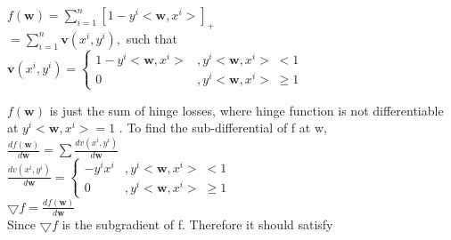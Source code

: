\documentclass[a4paper,11pt]{article}
\begin{document}
\begin{mlsolution}

\begin{math}f \left ( \textbf{w} \right ) = \sum_{i=1}^{n} \left [  1 - y^{i}<\textbf{w}, x^{i}> \right ]_{+}\end{math}\\

\begin{math}
= \sum_{i=1}^{n} \textbf{v}\left ( x^{i}, y^{i} \right ),\end{math} such that \begin{math}\textbf{v}\left ( x^{i}, y^{i} \right ) = \left\{\begin{matrix}
1 - y^{i}<\textbf{w}, x^{i}> &, y^{i}<\textbf{w}, x^{i}> \;<  1\\
0 & , y^{i}<\textbf{w}, x^{i}> \;\geq  1
\end{matrix}\right.
\end{math}

\begin{math}
f\left ( \textbf{w} \right )
\end{math} is just the sum of hinge losses, where hinge function is not differentiable at \begin{math}y^{i}<\textbf{w}, x^{i}> = 1\end{math} . To find the sub-differential of f at w, \\

\begin{math}
\frac{df\left ( \textbf{w} \right )}{d\textbf{w}} = \sum \frac{dv\left ( x^{i}, y^{i} \right )}{d\textbf{w}}
\end{math}\\

\begin{math}
\frac{dv\left ( x^{i}, y^{i} \right )}{d\textbf{w}} = \left\{\begin{matrix}
-y^{i}x^{i} &,  y^{i}<\textbf{w}, x^{i}> \;<  1\\ 
0 & , y^{i}<\textbf{w}, x^{i}> \;\geq  1
\end{matrix}\right.
\end{math}\\

\begin{math}
\bigtriangledown f = \frac{df\left ( \textbf{w} \right )}{d\textbf{w}}
\end{math}\\

Since \begin{math}\bigtriangledown f\end{math} is the subgradient of f. Therefore it should satisfy \\


\end{mlsolution}
\end{document}
